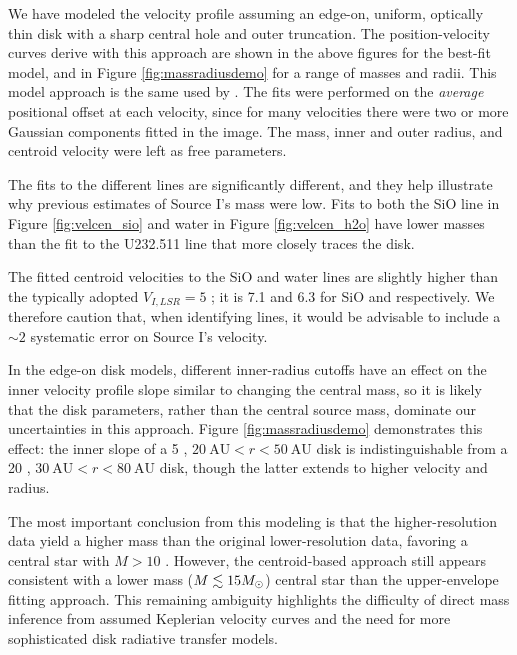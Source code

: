\documentclass[twocolumn]{aastex61}
\begin{document}
We have modeled the velocity profile assuming an edge-on, uniform, optically
thin disk with a sharp central hole and outer truncation.  The
position-velocity curves derive with this approach are shown in the above
figures for the best-fit model, and in Figure \ref{fig:massradiusdemo}
for a range of masses and radii.
This model approach is the same used by
\citet{Plambeck2016a}.
The fits were performed on the \emph{average} positional offset at each
velocity, since for many velocities there were two or more Gaussian
components fitted in the image.  The mass, inner and outer radius, and
centroid velocity were left as free parameters.

The fits to the different lines are significantly different, and they 
help illustrate why previous estimates of Source I's mass were low.
Fits to both the SiO line in Figure \ref{fig:velcen_sio} and water
in Figure \ref{fig:velcen_h2o} have lower masses than the fit to
the U232.511 line that more closely traces the disk.

The fitted centroid velocities to the SiO and water lines are slightly higher
than the typically adopted $V_{I,LSR}=5$ \kms; it is 7.1 and 6.3 \kms for SiO
and \water respectively.  We therefore caution that, when identifying lines, it
would be advisable to include a $\sim2$ \kms systematic error on Source I's
velocity.




In the edge-on disk models, different inner-radius cutoffs have an effect on
the inner velocity profile slope similar to changing the central mass, so it is
likely that the disk parameters, rather than the central source mass, dominate
our uncertainties in this approach.  
Figure \ref{fig:massradiusdemo} demonstrates this effect: the inner slope of
a 5 \msun, $20~\mathrm{AU} < r < 50~\mathrm{AU}$ disk is indistinguishable
from a 20 \msun , $30~\mathrm{AU} < r < 80~\mathrm{AU}$ disk, though the latter
extends to higher velocity and radius.

The most important conclusion from this modeling is that the higher-resolution
data yield a higher mass than the original lower-resolution data, favoring
a central star with $M>10$ \msun.  However, the centroid-based approach
still appears consistent with a lower mass ($M\lesssim15M_{\odot}$) central star
than the \citet{Seifried2016a} upper-envelope fitting approach.  This remaining
ambiguity highlights the difficulty of direct mass inference from assumed
Keplerian velocity curves and the need for more sophisticated disk radiative
transfer models.
\end{document}
